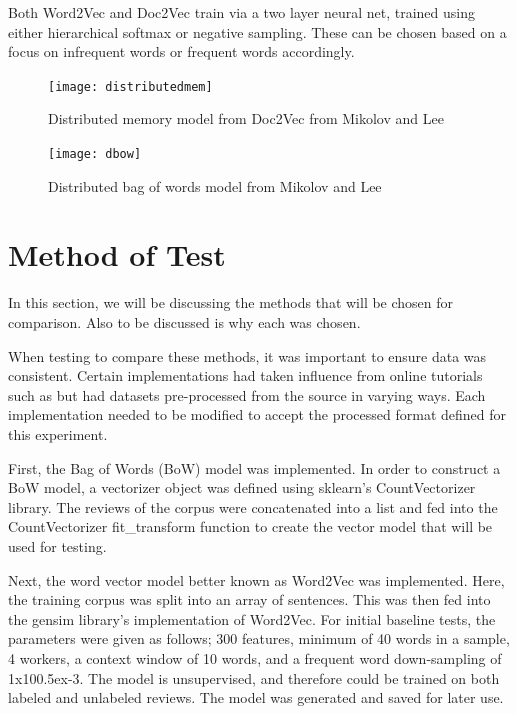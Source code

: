 \documentclass[journal]{IEEEtran}
\begin{document}
Both Word2Vec and Doc2Vec train via a two layer neural net, trained using either hierarchical softmax or negative sampling. These can be chosen based on a focus on infrequent words or frequent words accordingly.

\begin{figure}[ht]
\centering
\texttt{[image: distributedmem]}
\caption{Distributed memory model from Doc2Vec from Mikolov and Lee \cite{doc2vec}}
\label{fig:distributedmem}
\end{figure}

\begin{figure}[ht]
\centering
\texttt{[image: dbow]}
\caption{Distributed bag of words model from Mikolov and Lee \cite{doc2vec}}
\label{fig:dbow}
\end{figure}

\section{Method of Test}
In this section, we will be discussing the methods that will be chosen for comparison.
Also to be discussed is why each was chosen.

When testing to compare these methods, it was important to ensure data was consistent. Certain implementations had taken influence from online tutorials such as \cite{kagglecompetition} but had datasets pre-processed from the source in varying ways. Each implementation needed to be modified to accept the processed format defined for this experiment.

First, the Bag of Words (BoW) model was implemented. In order to construct a BoW model, a vectorizer object was defined using sklearn’s CountVectorizer library. The reviews of the corpus were concatenated into a list and fed into the CountVectorizer fit\_transform function to create the vector model that will be used for testing.

Next, the word vector model better known as Word2Vec was implemented. Here, the training corpus was split into an array of sentences. This was then fed into the gensim library’s implementation of Word2Vec. For initial baseline tests, the parameters were given as follows; 300 features, minimum of 40 words in a sample, 4 workers, a context window of 10 words, and a frequent word down-sampling of 1x10\raise0.5ex\hbox{-3}. The model is unsupervised, and therefore could be trained on both labeled and unlabeled reviews. The model was generated and saved for later use.
\end{document}
